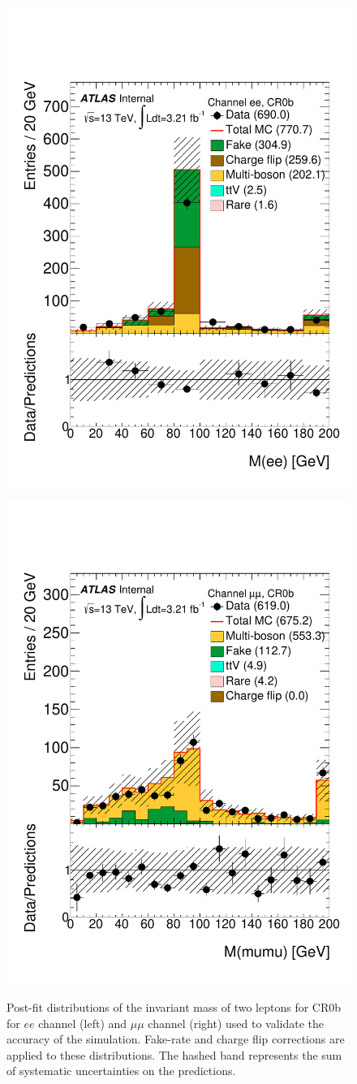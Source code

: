 \begin{figure}[htb]
\centering
 \includegraphics[width=.32\textwidth]{FIGURES/bckg_MC/SS3L/Fit/Mee_ee_CR0b_SS3L}
  \includegraphics[width=.32\textwidth]{FIGURES/bckg_MC/SS3L/Fit/Mmumu_mm_CR0b_SS3L}
\caption{
Post-fit distributions of the invariant mass of two leptons for CR0b for $ee$ channel (left) and $\mu\mu$ channel (right)  used to validate the accuracy of the simulation.
Fake-rate and charge flip corrections are applied to these distributions. The hashed band represents the sum of systematic uncertainties on the predictions.
\label{f:val_met_CR0b}
}
\end{figure}



